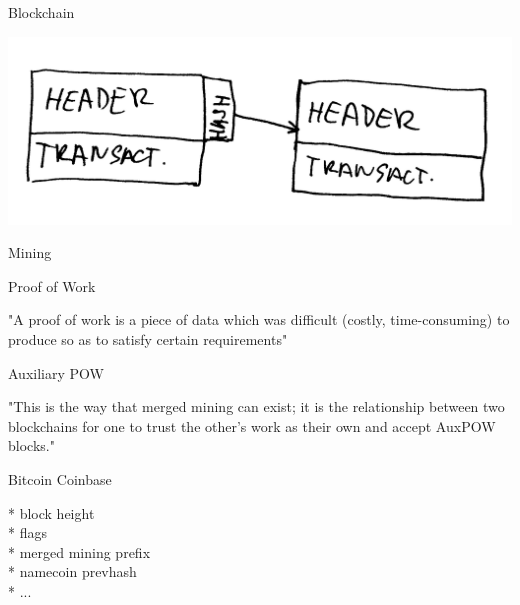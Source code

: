 \documentclass{beamer}
\begin{document}
\begin{frame}

    {\Huge Blockchain}\\

    \vspace{5mm}

    \includegraphics[scale=0.185]{img/blockchain}

\end{frame}

\begin{frame}

    {\Huge Mining}\\

\end{frame}

\begin{frame}

    {\Huge Proof of Work}\\

    \vspace{5mm}

    "A proof of work is a piece of data which was difficult (costly, time-consuming) to produce so as to satisfy certain requirements"\\

\end{frame}

\begin{frame}

    {\Huge Auxiliary POW}\\

    \vspace{5mm}

    "This is the way that merged mining can exist; it is the relationship between two blockchains for one to trust the other's work as their own and accept AuxPOW blocks."\\

\end{frame}

\begin{frame}

    {\Huge Bitcoin Coinbase}\\

    \vspace{5mm}

    * block height\\
    * flags\\
    * merged mining prefix\\
    * namecoin prevhash\\
    * ...\\

\end{frame}
\end{document}

